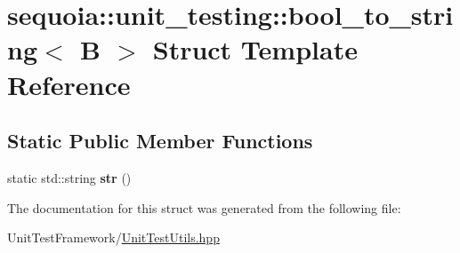 \hypertarget{structsequoia_1_1unit__testing_1_1bool__to__string}{}\section{sequoia\+::unit\+\_\+testing\+::bool\+\_\+to\+\_\+string$<$ B $>$ Struct Template Reference}
\label{structsequoia_1_1unit__testing_1_1bool__to__string}
\subsection*{Static Public Member Functions}
\begin{DoxyCompactItemize}
\item 
\mbox{\label{structsequoia_1_1unit__testing_1_1bool__to__string_af7115d2bd87af33a00827a30ba08df48}} 
static std\+::string {\bfseries str} ()
\end{DoxyCompactItemize}


The documentation for this struct was generated from the following file\+:\begin{DoxyCompactItemize}
\item 
Unit\+Test\+Framework/\mbox{\hyperlink{_unit_test_utils_8hpp}{Unit\+Test\+Utils.\+hpp}}\end{DoxyCompactItemize}
